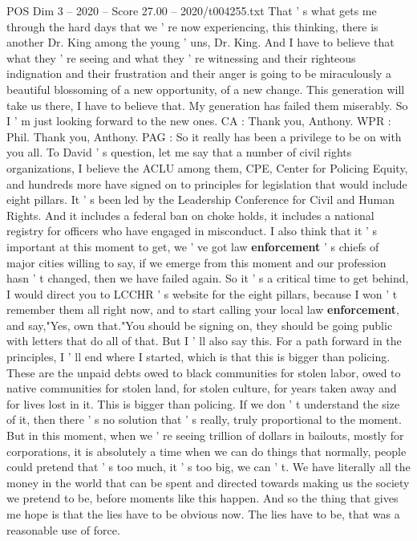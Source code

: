 \begin{textsample}{POS Dim 3 – 2020 – Score 27.00 – 2020/t004255.txt}
That ' s what gets me through the hard days that we ' re now experiencing, this thinking, there is another Dr.
King among the young ' uns, Dr.
King.
And I have to believe that what they ' re seeing and what they ' re witnessing and their righteous indignation and their frustration and their anger is going to be miraculously a beautiful blossoming of a new opportunity, of a new change.
This generation will take us there, I have to believe that.
My generation has failed them miserably.
So I ' m just looking forward to the new ones.
CA : Thank you, Anthony.
WPR : Phil.
Thank you, Anthony.
PAG : So it really has been a privilege to be on with you all.
To David ' s question, let me say that a number of civil rights organizations, I believe the ACLU among them, CPE, Center for Policing Equity, and hundreds more have signed on to principles for legislation that would include eight pillars.
It ' s been led by the Leadership Conference for Civil and Human Rights.
And it includes a federal ban on choke holds, it includes a national registry for officers who have engaged in misconduct.
I also think that it ' s important at this moment to get, we ' ve got law \textbf{enforcement} ' s chiefs of major cities willing to say, if we emerge from this moment and our profession hasn ' t changed, then we have failed again.
So it ' s a critical time to get behind, I would direct you to LCCHR ' s website for the eight pillars, because I won ' t remember them all right now, and to start calling your local law \textbf{enforcement}, and say,"Yes, own that."You should be signing on, they should be going public with letters that do all of that.
But I ' ll also say this.
For a path forward in the principles, I ' ll end where I started, which is that this is bigger than policing.
These are the unpaid debts owed to black communities for stolen labor, owed to native communities for stolen land, for stolen culture, for years taken away and for lives lost in it.
This is bigger than policing.
If we don ' t understand the size of it, then there ' s no solution that ' s really, truly proportional to the moment.
But in this moment, when we ' re seeing trillion of dollars in bailouts, mostly for corporations, it is absolutely a time when we can do things that normally, people could pretend that ' s too much, it ' s too big, we can ' t.
We have literally all the money in the world that can be spent and directed towards making us the society we pretend to be, before moments like this happen.
And so the thing that gives me hope is that the lies have to be obvious now.
The lies have to be, that was a reasonable use of force.

\end{textsample}
